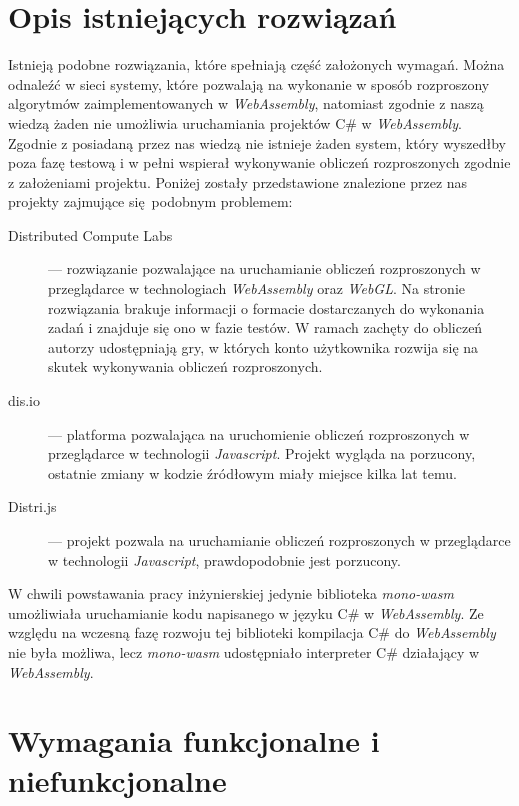\documentclass[a4paper,11pt,twoside]{report}
\theoremstyle{definition}
\begin{document}
    \section{Opis istniejących rozwiązań}
        Istnieją podobne rozwiązania, które spełniają część założonych wymagań.
        Można odnaleźć w sieci systemy, które pozwalają na wykonanie w sposób rozproszony algorytmów  zaimplementowanych w \textit{WebAssembly}, natomiast zgodnie z naszą wiedzą żaden nie umożliwia uruchamiania projektów C\# w \textit{WebAssembly}.
        Zgodnie z posiadaną przez nas wiedzą nie istnieje żaden system, który wyszedłby poza fazę testową i w pełni wspierał wykonywanie obliczeń rozproszonych zgodnie z założeniami projektu.
        Poniżej zostały przedstawione znalezione przez nas projekty zajmujące się podobnym problemem:
        
        \begin{description}
            \item[Distributed Compute Labs~\cite{distributed-compute-labs}] --- rozwiązanie pozwalające na uruchamianie obliczeń rozproszonych w przeglądarce w technologiach \textit{WebAssembly} oraz \textit{WebGL}. Na stronie rozwiązania brakuje informacji o formacie dostarczanych do wykonania zadań i znajduje się ono w fazie testów. W ramach zachęty do obliczeń autorzy udostępniają gry, w których konto użytkownika rozwija się na skutek wykonywania obliczeń rozproszonych.
            \item[dis.io~\cite{dis-io}] --- platforma pozwalająca na uruchomienie obliczeń rozproszonych w przeglądarce w technologii \textit{Javascript}. Projekt wygląda na porzucony, ostatnie zmiany w kodzie źródłowym miały miejsce kilka lat temu.
            \item[Distri.js~\cite{distri-js}] --- projekt pozwala na uruchamianie obliczeń rozproszonych w przeglądarce w technologii \textit{Javascript}, prawdopodobnie jest porzucony.
        \end{description}
        
        
        W chwili powstawania pracy inżynierskiej jedynie biblioteka \textit{mono-wasm} umożliwiała uruchamianie kodu napisanego w języku C\# w \textit{WebAssembly}.
        Ze względu na wczesną fazę rozwoju tej biblioteki kompilacja C\# do \textit{WebAssembly} nie była możliwa, lecz \textit{mono-wasm} udostępniało interpreter C\# działający w \textit{WebAssembly}.
        
		\section{Wymagania funkcjonalne i niefunkcjonalne}
                
\end{document}
